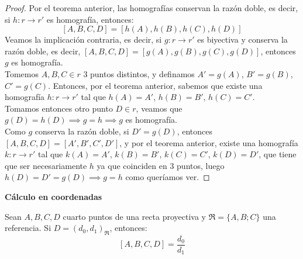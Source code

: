 \begin{proof}
    Por el teorema anterior, las homografías conservan la razón doble, es decir, si $h: r \to r'$ es homografía, entonces:
    \[
    \left[ A, B, C, D \right] =
    \left[ h(A), h(B), h(C), h(D) \right]
    \]
    Veamos la implicación contraria, es decir, si $g: r \to r'$ es biyectiva y conserva la razón doble, es decir, $\left[ A, B, C, D \right] = \left[ g(A), g(B), g(C), g(D) \right]$, entonces $g$ es homografía.\\
    
    Tomemos $A,B,C \in r$ 3 puntos distintos, y definamos $A' = g(A)$, $B' = g(B)$, $C' = g(C)$. Entonces, por el teorema anterior, sabemos que existe una homografía $h: r \to r'$ tal que $h(A) = A'$, $h(B) = B'$, $h(C) = C'$.\\

    Tomamos entonces otro punto $D \in r$, veamos que $g(D) = h(D) \implies g = h \implies g$ es homografía. \\

    Como $g$ conserva la razón doble, si $D' = g(D)$, entonces $\left[ A, B, C, D \right] = \left[ A', B', C', D' \right]$, y por el teorema anterior, existe una homografía $k: r \to r'$ tal que $k(A) = A'$, $k(B) = B'$, $k(C) = C'$, $k(D) = D'$, que tiene que ser necesariamente $h$ ya que coinciden en 3 puntos, luego $h(D) = D' = g(D) \implies g = h$ como queríamos ver.
\end{proof}

\textbf{Cálculo en coordenadas}

\begin{lema}
    Sean  $A,B,C,D$ cuarto puntos de una recta proyectiva y $\mathfrak{R} = \{A,B;C\}$ una referencia. Si $D=(d_0,d_1)_\mathfrak{R}$, entonces:
    \[
    \left[ A, B, C, D \right] = \frac{d_0}{d_1}
    \]
\end{lema}

